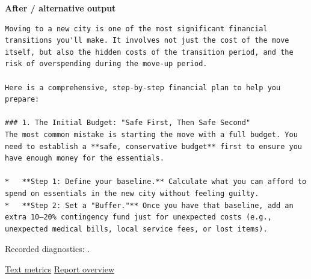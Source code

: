 \textbf{After / alternative output}

\begin{Verbatim}
Moving to a new city is one of the most significant financial transitions you'll make. It involves not just the cost of the move itself, but also the hidden costs of the transition period, and the risk of overspending during the move-up period.

Here is a comprehensive, step-by-step financial plan to help you prepare:

### 1. The Initial Budget: "Safe First, Then Safe Second"
The most common mistake is starting the move with a full budget. You need to establish a **safe, conservative budget** first to ensure you have enough money for the essentials.

*   **Step 1: Define your baseline.** Calculate what you can afford to spend on essentials in the new city without feeling guilty.
*   **Step 2: Set a "Buffer."** Once you have that baseline, add an extra 10–20% contingency fund just for unexpected costs (e.g., unexpected medical bills, local service fees, or lost items).
\end{Verbatim}

Recorded diagnostics:
\texttt{}.

\href{records/docs/watermarking/text.tex}{Text metrics} \textbar{}
\href{../docs/watermarking/README.md}{Report overview}
